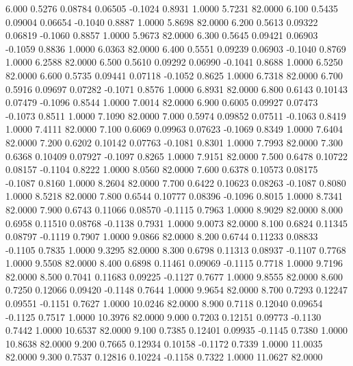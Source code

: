    6.000   0.5276   0.08784   0.06505  -0.1024   0.8931   1.0000   5.7231  82.0000
   6.100   0.5435   0.09004   0.06654  -0.1040   0.8887   1.0000   5.8698  82.0000
   6.200   0.5613   0.09322   0.06819  -0.1060   0.8857   1.0000   5.9673  82.0000
   6.300   0.5645   0.09421   0.06903  -0.1059   0.8836   1.0000   6.0363  82.0000
   6.400   0.5551   0.09239   0.06903  -0.1040   0.8769   1.0000   6.2588  82.0000
   6.500   0.5610   0.09292   0.06990  -0.1041   0.8688   1.0000   6.5250  82.0000
   6.600   0.5735   0.09441   0.07118  -0.1052   0.8625   1.0000   6.7318  82.0000
   6.700   0.5916   0.09697   0.07282  -0.1071   0.8576   1.0000   6.8931  82.0000
   6.800   0.6143   0.10143   0.07479  -0.1096   0.8544   1.0000   7.0014  82.0000
   6.900   0.6005   0.09927   0.07473  -0.1073   0.8511   1.0000   7.1090  82.0000
   7.000   0.5974   0.09852   0.07511  -0.1063   0.8419   1.0000   7.4111  82.0000
   7.100   0.6069   0.09963   0.07623  -0.1069   0.8349   1.0000   7.6404  82.0000
   7.200   0.6202   0.10142   0.07763  -0.1081   0.8301   1.0000   7.7993  82.0000
   7.300   0.6368   0.10409   0.07927  -0.1097   0.8265   1.0000   7.9151  82.0000
   7.500   0.6478   0.10722   0.08157  -0.1104   0.8222   1.0000   8.0560  82.0000
   7.600   0.6378   0.10573   0.08175  -0.1087   0.8160   1.0000   8.2604  82.0000
   7.700   0.6422   0.10623   0.08263  -0.1087   0.8080   1.0000   8.5218  82.0000
   7.800   0.6544   0.10777   0.08396  -0.1096   0.8015   1.0000   8.7341  82.0000
   7.900   0.6743   0.11066   0.08570  -0.1115   0.7963   1.0000   8.9029  82.0000
   8.000   0.6958   0.11510   0.08768  -0.1138   0.7931   1.0000   9.0073  82.0000
   8.100   0.6824   0.11345   0.08797  -0.1119   0.7907   1.0000   9.0866  82.0000
   8.200   0.6744   0.11233   0.08833  -0.1105   0.7835   1.0000   9.3295  82.0000
   8.300   0.6798   0.11313   0.08937  -0.1107   0.7768   1.0000   9.5508  82.0000
   8.400   0.6898   0.11461   0.09069  -0.1115   0.7718   1.0000   9.7196  82.0000
   8.500   0.7041   0.11683   0.09225  -0.1127   0.7677   1.0000   9.8555  82.0000
   8.600   0.7250   0.12066   0.09420  -0.1148   0.7644   1.0000   9.9654  82.0000
   8.700   0.7293   0.12247   0.09551  -0.1151   0.7627   1.0000  10.0246  82.0000
   8.900   0.7118   0.12040   0.09654  -0.1125   0.7517   1.0000  10.3976  82.0000
   9.000   0.7203   0.12151   0.09773  -0.1130   0.7442   1.0000  10.6537  82.0000
   9.100   0.7385   0.12401   0.09935  -0.1145   0.7380   1.0000  10.8638  82.0000
   9.200   0.7665   0.12934   0.10158  -0.1172   0.7339   1.0000  11.0035  82.0000
   9.300   0.7537   0.12816   0.10224  -0.1158   0.7322   1.0000  11.0627  82.0000
